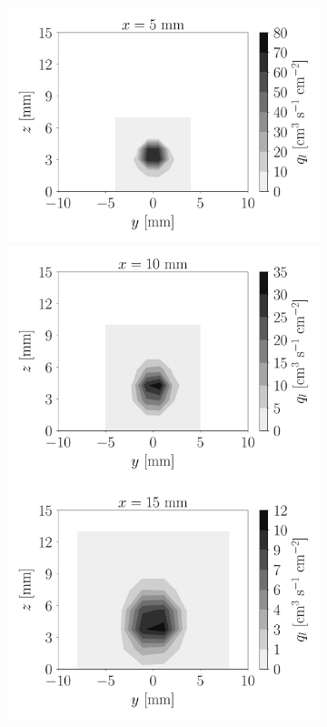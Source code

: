 \begin{figure}[ht]
\begin{subfigure}[b]{1.1\textwidth}
	\flushleft
   \includegraphics[scale=0.225]{./part2_developments/figures_ch5_resolved_JICF/flow_rates_ibs/spatial_maps/UG100_DX20_x05mm_volume_flux}
   \includegraphics[scale=0.225]{./part2_developments/figures_ch5_resolved_JICF/flow_rates_ibs/spatial_maps/UG100_DX20_x10mm_volume_flux}
   \includegraphics[scale=0.225]{./part2_developments/figures_ch5_resolved_JICF/flow_rates_ibs/spatial_maps/UG100_DX20_x15mm_volume_flux}

\end{subfigure}
\end{figure}

